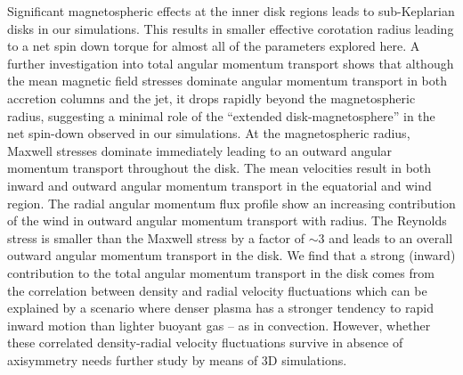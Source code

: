 \documentclass[fleqn,usenatbib]{mnras}
\begin{document}
Significant magnetospheric effects at the inner disk regions leads to sub-Keplarian disks in our simulations. This results in smaller effective corotation radius leading to a net spin down torque for almost all of the parameters explored here. A further investigation into total angular momentum transport shows that although the mean magnetic field stresses dominate angular momentum transport in both accretion columns and the jet, it drops rapidly beyond the magnetospheric radius, suggesting a minimal role of the ``extended disk-magnetosphere'' in the net spin-down observed in our simulations. At the magnetospheric radius, Maxwell stresses dominate immediately leading to an outward angular momentum transport throughout the disk. The mean velocities result in both inward and outward angular momentum transport in the equatorial and wind region. The radial angular momentum flux profile show an increasing contribution of the wind in outward angular momentum transport with radius. The Reynolds stress is smaller than the Maxwell stress by a factor of $\sim 3$ and leads to an overall outward angular momentum transport in the disk. We find that a strong (inward) contribution to the total angular momentum transport in the disk comes from the correlation between density and radial velocity fluctuations which can be explained by a scenario where denser plasma has a stronger tendency to rapid inward motion than lighter buoyant gas -- as in convection. However, whether these correlated density-radial velocity fluctuations survive in absence of axisymmetry needs further study by means of 3D simulations.
\end{document}
